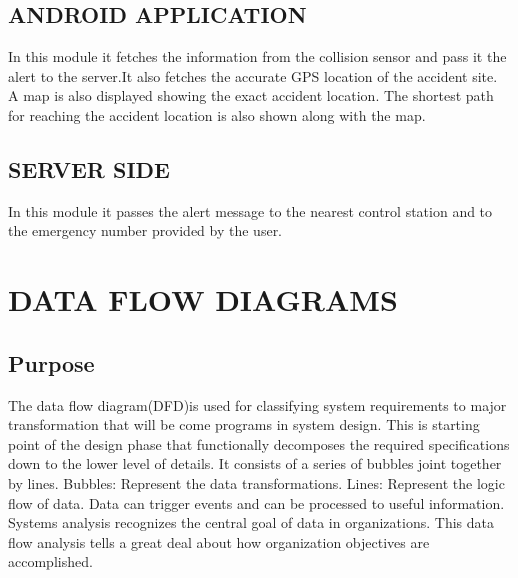 \documentclass[12pt,a4paper,oneside]{report}
\begin{document}
{\subsection{ANDROID APPLICATION}
\par In this module it fetches the information from the collision sensor and pass it the alert to the server.It also fetches the accurate GPS location of the accident site. A map is also displayed showing the exact accident location. The shortest path for reaching the accident location is also shown along with the map.
\subsection{SERVER SIDE}
\par In this module it passes the alert message to the nearest control station and to the emergency number provided by the user.
\newpage



\newpage
\section{DATA FLOW DIAGRAMS}
\subsection {Purpose} 
\par The data ﬂow diagram(DFD)is used for classifying system requirements to major transformation that will be come programs in system design. This is starting point of the design phase that functionally decomposes the required specifications down to the lower level of details. It consists of a series of bubbles joint together by lines. Bubbles: Represent the data transformations. Lines: Represent the logic ﬂow of data. Data can trigger events and can be processed to useful information. Systems analysis recognizes the central goal of data in organizations. This data flow analysis tells a great deal about how organization objectives are accomplished.


}
\end{document}
